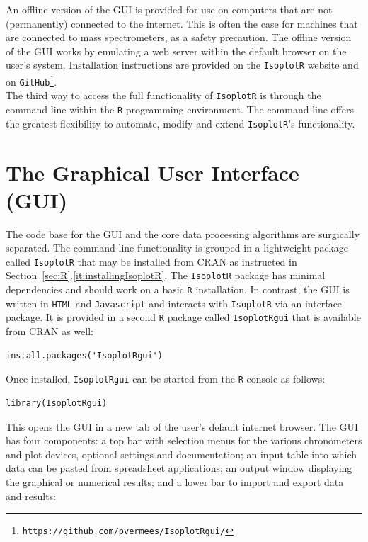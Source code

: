 \begin{refsection}
An offline version of the GUI is provided for use on computers that
are not (permanently) connected to the internet. This is often the
case for machines that are connected to mass spectrometers, as a
safety precaution. The offline version of the GUI works by emulating a
web server within the default browser on the user's
system. Installation instructions are provided on the
\texttt{IsoplotR} website and on
\texttt{GitHub}\footnote{\texttt{https://github.com/pvermees/IsoplotRgui/}}.\\

The third way to access the full functionality of \texttt{IsoplotR} is
through the command line within the \texttt{R} programming
environment. The command line offers the greatest flexibility to
automate, modify and extend \texttt{IsoplotR}'s functionality.

\section{The Graphical User Interface (GUI)}
\label{sec:GUI}

The code base for the GUI and the core data processing algorithms are
surgically separated. The command-line functionality is grouped in a
lightweight package called \texttt{IsoplotR} that may be installed
from CRAN as instructed in
Section~\ref{sec:R}.\ref{it:installingIsoplotR}. The \texttt{IsoplotR}
package has minimal dependencies and should work on a basic \texttt{R}
installation. In contrast, the GUI is written in \texttt{HTML} and
\texttt{Javascript} and interacts with \texttt{IsoplotR} via an
interface package. It is provided in a second \texttt{R} package
called \texttt{IsoplotRgui} that is available from CRAN as well:

\begin{verbatim}
install.packages('IsoplotRgui')
\end{verbatim}

Once installed, \texttt{IsoplotRgui} can be started from the
\texttt{R} console as follows:

\begin{verbatim}
library(IsoplotRgui)
\end{verbatim}

This opens the GUI in a new tab of the user's default internet
browser.  The GUI has four components: a top bar with selection menus
for the various chronometers and plot devices, optional settings and
documentation; an input table into which data can be pasted from
spreadsheet applications; an output window displaying the graphical or
numerical results; and a lower bar to import and export data and
results:\\


\end{refsection}
